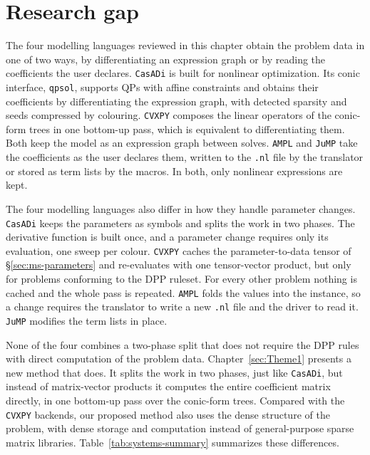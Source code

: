 \section{Research gap}
\label{sec:research-gap}

The four modelling languages reviewed in this chapter obtain the problem data in one of two ways,
by differentiating an expression graph or by reading the coefficients the user declares.
\texttt{CasADi} is built for nonlinear optimization. Its conic interface, \texttt{qpsol}, supports
\acp{QP} with affine constraints and obtains their coefficients by differentiating the expression
graph, with detected sparsity and seeds compressed by colouring. \texttt{CVXPY} composes the
linear operators of the conic-form trees in one bottom-up pass, which is equivalent to
differentiating them. Both keep the model as an expression graph between solves. \texttt{AMPL} and
\texttt{JuMP} take the coefficients as the user declares them, written to the \texttt{.nl} file by
the translator or stored as term lists by the macros. In both, only nonlinear expressions are
kept.

The four modelling languages also differ in how they handle parameter changes. \texttt{CasADi}
keeps the parameters as symbols and splits the work in two phases. The derivative function is
built once, and a parameter change requires only its evaluation, one sweep per colour.
\texttt{CVXPY} caches the parameter-to-data tensor of \S\ref{sec:ms-parameters} and re-evaluates
with one tensor-vector product, but only for problems conforming to the \ac{DPP} ruleset. For
every other problem nothing is cached and the whole pass is repeated. \texttt{AMPL} folds the
values into the instance, so a change requires the translator to write a new \texttt{.nl} file and
the driver to read it. \texttt{JuMP} modifies the term lists in place.

None of the four combines a two-phase split that does not require the \ac{DPP} rules with direct
computation of the problem data.
Chapter~\ref{sec:Theme1} presents a new method that does. It splits the work in two phases, just
like \texttt{CasADi}, but instead of matrix-vector products it computes the entire coefficient
matrix directly, in one bottom-up pass over the conic-form trees. Compared with the \texttt{CVXPY}
backends, our proposed method also uses the dense structure of the problem, with dense storage and
computation instead of general-purpose sparse matrix libraries. Table~\ref{tab:systems-summary}
summarizes these differences.

